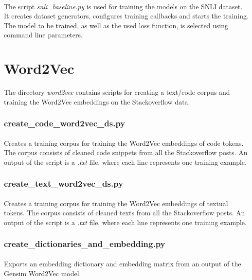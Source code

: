 \paragraph{}
The script \textit{snli\_baseline.py} is used for training the models on the SNLI dataset. It creates dataset generators, configures training callbacks and starts the training. The model to be trained, as well as the used loss function, is selected using command line parameters.


\section{Word2Vec}
\paragraph{}
The directory \textit{word2vec} contains scripts for creating a text/code corpus and training the Word2Vec embeddings on the Stackoverflow data.

\subsubsection{create\_code\_word2vec\_ds.py}
\paragraph{}
Creates a training corpus for training the Word2Vec embeddings of code tokens. The corpus consists of cleaned code snippets from all the Stackoverflow posts. An output of the script is a \textit{.txt} file, where each line represents one training example.

\subsubsection{create\_text\_word2vec\_ds.py}
\paragraph{}
Creates a training corpus for training the Word2Vec embeddings of textual tokens. The corpus consists of cleaned texts from all the Stackoverflow posts. An output of the script is a \textit{.txt} file, where each line represents one training example.

\subsubsection{create\_dictionaries\_and\_embedding.py}
\paragraph{}
Exports an embedding dictionary and embedding matrix from an output of the Gensim Word2Vec model.

